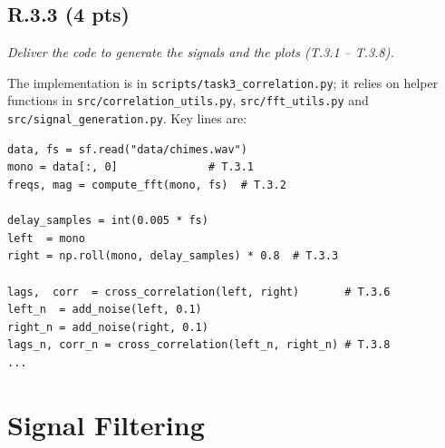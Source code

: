 \documentclass{article}
\begin{document}
\subsection*{R.3.3 (4 pts)}
\emph{Deliver the code to generate the signals and the plots (T.3.1 – T.3.8).}

The implementation is in \texttt{scripts/task3\_correlation.py}; it relies on helper functions in \texttt{src/correlation\_utils.py}, \texttt{src/fft\_utils.py} and \texttt{src/signal\_generation.py}. Key lines are:

\begin{verbatim}
data, fs = sf.read("data/chimes.wav")
mono = data[:, 0]              # T.3.1
freqs, mag = compute_fft(mono, fs)  # T.3.2

delay_samples = int(0.005 * fs)
left  = mono
right = np.roll(mono, delay_samples) * 0.8  # T.3.3

lags,  corr  = cross_correlation(left, right)       # T.3.6
left_n  = add_noise(left, 0.1)
right_n = add_noise(right, 0.1)
lags_n, corr_n = cross_correlation(left_n, right_n) # T.3.8
...
\end{verbatim}


\section{Signal Filtering}
\end{document}
